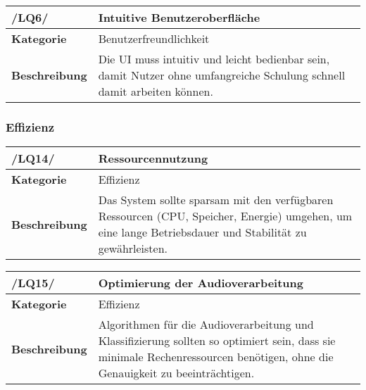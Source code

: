 \begin{table}[h!]
\begin{tabularx}{13cm}{|l|X|}
\hline
\textbf{/LQ6/} & \textbf{Intuitive Benutzeroberfläche} \\ \hline
\textbf{Kategorie} & Benutzerfreundlichkeit \\ \hline
\textbf{Beschreibung} & Die UI muss intuitiv und leicht bedienbar sein, damit Nutzer ohne umfangreiche Schulung schnell damit arbeiten können. \\ \hline
\end{tabularx}
\end{table}


\subsubsection{Effizienz}

\begin{table}[h!]
\begin{tabularx}{13cm}{|l|X|}
\hline
\textbf{/LQ14/} & \textbf{Ressourcennutzung} \\ \hline
\textbf{Kategorie} & Effizienz \\ \hline
\textbf{Beschreibung} & Das System sollte sparsam mit den verfügbaren Ressourcen (CPU, Speicher, Energie) umgehen, um eine lange Betriebsdauer und Stabilität zu gewährleisten. \\ \hline
\end{tabularx}
\end{table}

\begin{table}[h!]
\begin{tabularx}{13cm}{|l|X|}
\hline
\textbf{/LQ15/} & \textbf{Optimierung der Audioverarbeitung} \\ \hline
\textbf{Kategorie} & Effizienz \\ \hline
\textbf{Beschreibung} & Algorithmen für die Audioverarbeitung und Klassifizierung sollten so optimiert sein, dass sie minimale Rechenressourcen benötigen, ohne die Genauigkeit zu beeinträchtigen. \\ \hline
\end{tabularx}
\end{table}
